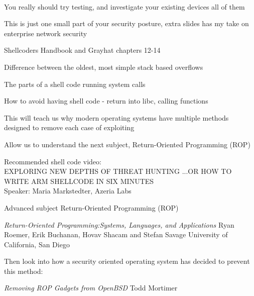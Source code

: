 \documentclass[Screen16to9,17pt]{foils}
\begin{document}

~
\begin{list2}
\item You really should try testing, and investigate your existing devices
all of them
\item This is just one small part of your security posture, extra slides has my take on enterprise network security
\end{list2}

\myquestionspage





\begin{list1}
\item Shellcoders Handbook  and Grayhat chapters 12-14
\item Difference between the oldest, most simple stack based overflows
\item The parts of a shell code running system calls
\item How to avoid having shell code - return into libc, calling functions
\item This will teach us why modern operating systems have multiple methods designed to remove each case of exploiting
\item Allow us to understand the next subject, Return-Oriented Programming (ROP)
\end{list1}

Recommended shell code video:\\
EXPLORING NEW DEPTHS OF THREAT HUNTING ...OR HOW TO WRITE ARM SHELLCODE IN SIX MINUTES\\
Speaker: Maria Markstedter, Azeria Labs\\



\begin{list1}
\item Advanced subject Return-Oriented Programming (ROP)
\item \emph{Return-Oriented Programming:Systems, Languages, and Applications}
Ryan Roemer, Erik Buchanan, Hovav Shacam and Stefan Savage University of California, San Diego\\
\item Then look into how a security oriented operating system has decided to prevent this method:
\item \emph{Removing ROP Gadgets from OpenBSD}
Todd Mortimer\\
\end{list1}
\end{document}
